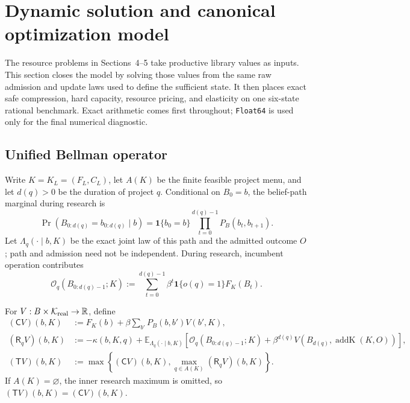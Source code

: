 \section{Dynamic solution and canonical optimization model}\label{sec:control}

The resource problems in Sections~4--5 take productive library values as
inputs.  This section closes the model by solving those values from the same
raw admission and update laws used to define the sufficient state.  It then
places exact safe compression, hard capacity, resource pricing, and elasticity
on one six-state rational benchmark.  Exact arithmetic comes first throughout;
\texttt{Float64} is used only for the final numerical diagnostic.

\subsection{Unified Bellman operator}

Write \(K=K_L=(F_L,C_L)\), let \(A(K)\) be the finite feasible project menu,
and let \(d(q)>0\) be the duration of project \(q\).  Conditional on \(B_0=b\),
the belief-path marginal during research is
\begin{equation}\label{eq:control-belief-path}
 \Pr(B_{0:d(q)}=b_{0:d(q)}\mid b)
 =\mathbf 1\{b_0=b\}\prod_{t=0}^{d(q)-1}P_B(b_t,b_{t+1}).
\end{equation}
Let \(\Lambda_q(\cdot\mid b,K)\) be the exact joint law of this path and the
admitted outcome \(O\); path and admission need not be independent.  During
research, incumbent operation contributes
\begin{equation}\label{eq:control-operating-reward}
 \mathcal O_q(B_{0:d(q)-1};K)
 :=\sum_{t=0}^{d(q)-1}\beta^t
   \mathbf 1\{o(q)=1\}F_K(B_t).
\end{equation}

\begin{definition}
\label{def:dynamic-control-operators}
For \(V:B\times\mathcal K_{\rm real}\to\mathbb R\), define
\begin{align}
 (\mathsf C V)(b,K)
   &:=F_K(b)+\beta\sum_{b'}P_B(b,b')V(b',K),
   \label{eq:control-continue}\\
 (\mathsf R_qV)(b,K)
   &:=-\kappa(b,K,q)
     +\mathbb E_{\Lambda_q(\cdot\mid b,K)}\!\left[
       \mathcal O_q(B_{0:d(q)-1};K)
       +\beta^{d(q)}V\!\left(B_{d(q)},
          \operatorname{addK}(K,O)\right)\right],
   \label{eq:control-research}\\
 (\mathsf TV)(b,K)
   &:=\max\!\left\{(\mathsf CV)(b,K),
       \max_{q\in A(K)}(\mathsf R_qV)(b,K)\right\}.
 \label{eq:control-bellman-operator}
\end{align}
If \(A(K)=\varnothing\), the inner research maximum is omitted, so
\((\mathsf TV)(b,K)=(\mathsf CV)(b,K)\).
\end{definition}

